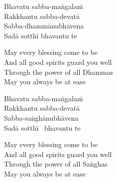 \begin{pali-hang-continued}
Bhavatu sabba-maṅgalaṁ\\
Rakkhantu sabba-devatā\\
Sabba-dhammānubhāvena\\
Sadā sotthī bhavantu te
\end{pali-hang-continued}

\begin{english-verses}
  May every blessing come to be\\
  And all good spirits guard you well\\
  Through the power of all Dhammas\\
  May you always be at ease
\end{english-verses}

\begin{pali-hang-continued}
Bhavatu sabba-maṅgalaṁ\\
Rakkhantu sabba-devatā\\
Sabba-saṅghānubhāvena\\
Sadā sotthī \breathmark\ bhavantu te
\end{pali-hang-continued}

\begin{english-verses}
  May every blessing come to be\\
  And all good spirits guard you well\\
  Through the power of all Saṅghas\\
  May you always be at ease
\end{english-verses}

\suttaRef{[Trad]}

